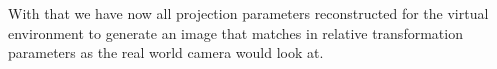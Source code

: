 

With that we have now all projection parameters reconstructed for the virtual 
environment to generate an image that matches in relative transformation 
parameters as the real world camera would look at.